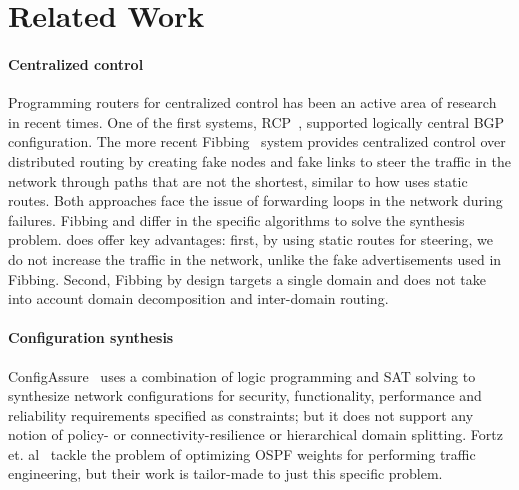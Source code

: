 \section{Related Work}\label{sec:related}
\paragraph{Centralized control} Programming routers for centralized
control has been an active area of research in recent times. One of
the first systems, RCP~\cite{rcp}, supported logically central BGP
configuration. The more recent Fibbing~\cite{fibbing} system provides
centralized control over distributed routing by creating fake nodes
and fake links to steer the traffic in the network through paths that
are not the shortest, similar to how \name uses static routes.  Both
approaches face the issue of forwarding loops in the network during
failures. Fibbing and \name differ in the specific algorithms to solve
the synthesis problem.  \name does offer key advantages: first, by
using static routes for steering, we do not increase the traffic in
the network, unlike the fake advertisements used in Fibbing. Second,
Fibbing by design targets a single domain and does not take into account
domain decomposition and inter-domain routing. 



\paragraph{Configuration synthesis} 
ConfigAssure~\cite{configassure}
uses a combination of logic programming and SAT solving to synthesize
network configurations for security, 
functionality, performance and
reliability requirements specified as constraints; 
but it does not
support any notion of policy- or connectivity-resilience 
or hierarchical domain splitting.  Fortz
et. al~\cite{ospf-te} tackle the problem of optimizing OSPF weights
for performing traffic engineering, but their work is tailor-made
to just this specific problem.

